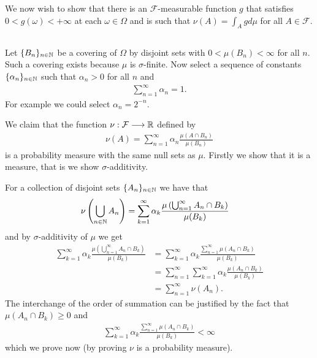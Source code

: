 \documentclass{unswmaths}
\begin{document}
We now wish to show that there is an $ \mathcal{F}$-measurable function $ g $ that satisfies $ 0 < g(\omega) < +\infty $ at each $ \omega \in \Omega $ and is such that $ \nu(A) = \int_Agd\mu $ for all $ A \in \mathcal{F} $.

\subsection{}
Let $ \{ B_n \}_{n \in \mathbb{N}} $ be a covering of $ \Omega $ by disjoint sets with $ 0 < \mu(B_n) < \infty $ for all $ n $. Such a covering exists because $ \mu $ is $\sigma$-finite. Now select a sequence of constants $ \{ \alpha_n \}_{n \in \mathbb{N}} $ such that $ \alpha_n > 0 $ for all $ n $ and 
\begin{align}
	\sum_{n=1}^\infty \alpha_n = 1.
\end{align}
For example we could select  $ \alpha_n = 2^{-n} $.

We claim that the function $ \nu : \mathcal{F} \longrightarrow \mathbb{R} $ defined by
\begin{align}
	\nu(A) = \sum_{n=1}^\infty \alpha_n \frac{\mu(A \cap B_n)}{\mu(B_n)}
\end{align}
is a probability measure with the same null sets as $ \mu $.
Firstly we show that it is a measure, that is we show $\sigma$-additivity.

For a collection of disjoint sets $ \{ A_n \}_{n \in \mathbb{N}} $ we have that
\begin{align}
	\nu\left( \bigcup_{n\in\mathbb{N}} A_n \right) &= \sum_{k=1}^\infty \alpha_k \frac{\mu\left( \bigcup_{n=1}^\infty A_n \cap B_k \right)}{\mu(B_k)}
\end{align}
and by $ \sigma$-additivity of $ \mu $ we get
\begin{align}
	\sum_{k=1}^\infty \alpha_k \frac{\mu\left( \bigcup_{n=1}^\infty A_n \cap B_k \right)}{\mu(B_k)} &= \sum_{k=1}^\infty \alpha_k \frac{\sum_{n=1}^\infty \mu\left( A_n \cap B_k \right)}{\mu(B_k)} \\
	&= \sum_{n=1}^\infty  \sum_{k=1}^\infty \alpha_k \frac{\mu\left( A_n \cap B_k \right)}{\mu(B_k)} \\
	&= \sum_{n=1}^\infty \nu(A_n).
\end{align}
The interchange of the order of summation can be justified by the fact that
$ \mu(A_n \cap B_k) \geq 0 $ and 
\begin{align}
\sum_{k=1}^\infty \alpha_k \frac{\sum_{n=1}^\infty \mu\left( A_n \cap B_k \right)}{\mu(B_k)} < \infty
\end{align}
which we prove now (by proving $ \nu $ is a probability measure).
\end{document}
